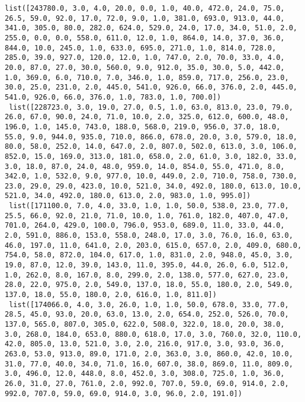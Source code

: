\documentclass[11pt]{article}
\begin{document}
\begin{Verbatim}[commandchars=\\\{\}]
 list([243780.0, 3.0, 4.0, 20.0, 0.0, 1.0, 40.0, 472.0, 24.0, 75.0, 26.5, 59.0, 92.0, 17.0, 72.0, 9.0, 1.0, 381.0, 693.0, 913.0, 44.0, 341.0, 305.0, 80.0, 282.0, 624.0, 529.0, 24.0, 17.0, 34.0, 51.0, 2.0, 255.0, 0.0, 0.0, 558.0, 611.0, 12.0, 1.0, 864.0, 14.0, 37.0, 36.0, 844.0, 10.0, 245.0, 1.0, 633.0, 695.0, 271.0, 1.0, 814.0, 728.0, 285.0, 39.0, 927.0, 120.0, 12.0, 1.0, 747.0, 2.0, 70.0, 33.0, 4.0, 20.0, 87.0, 27.0, 30.0, 560.0, 9.0, 912.0, 35.0, 30.0, 5.0, 442.0, 1.0, 369.0, 6.0, 710.0, 7.0, 346.0, 1.0, 859.0, 717.0, 256.0, 23.0, 30.0, 25.0, 231.0, 2.0, 445.0, 541.0, 926.0, 66.0, 376.0, 2.0, 445.0, 541.0, 926.0, 66.0, 376.0, 1.0, 783.0, 1.0, 700.0])
 list([228723.0, 3.0, 19.0, 27.0, 0.5, 1.0, 63.0, 813.0, 23.0, 79.0, 26.0, 67.0, 90.0, 24.0, 71.0, 10.0, 2.0, 325.0, 612.0, 600.0, 48.0, 196.0, 1.0, 145.0, 743.0, 188.0, 568.0, 219.0, 956.0, 37.0, 18.0, 55.0, 9.0, 944.0, 935.0, 710.0, 866.0, 678.0, 20.0, 3.0, 579.0, 18.0, 80.0, 58.0, 252.0, 14.0, 647.0, 2.0, 807.0, 502.0, 613.0, 3.0, 106.0, 852.0, 15.0, 169.0, 313.0, 181.0, 658.0, 2.0, 61.0, 3.0, 182.0, 33.0, 3.0, 18.0, 87.0, 24.0, 48.0, 959.0, 14.0, 854.0, 55.0, 471.0, 8.0, 342.0, 1.0, 532.0, 9.0, 977.0, 10.0, 449.0, 2.0, 710.0, 758.0, 730.0, 23.0, 29.0, 29.0, 423.0, 10.0, 521.0, 34.0, 492.0, 180.0, 613.0, 10.0, 521.0, 34.0, 492.0, 180.0, 613.0, 2.0, 983.0, 1.0, 995.0])
 list([171100.0, 7.0, 4.0, 33.0, 1.0, 1.0, 50.0, 538.0, 23.0, 77.0, 25.5, 66.0, 92.0, 21.0, 71.0, 10.0, 1.0, 761.0, 182.0, 407.0, 47.0, 701.0, 264.0, 429.0, 100.0, 796.0, 953.0, 689.0, 11.0, 33.0, 44.0, 2.0, 591.0, 886.0, 153.0, 558.0, 248.0, 17.0, 3.0, 76.0, 16.0, 63.0, 46.0, 197.0, 11.0, 641.0, 2.0, 203.0, 615.0, 657.0, 2.0, 409.0, 680.0, 754.0, 58.0, 872.0, 104.0, 617.0, 1.0, 831.0, 2.0, 948.0, 45.0, 3.0, 19.0, 87.0, 12.0, 39.0, 143.0, 11.0, 395.0, 44.0, 26.0, 6.0, 512.0, 1.0, 262.0, 8.0, 167.0, 8.0, 299.0, 2.0, 138.0, 577.0, 627.0, 23.0, 28.0, 22.0, 975.0, 2.0, 549.0, 137.0, 18.0, 55.0, 180.0, 2.0, 549.0, 137.0, 18.0, 55.0, 180.0, 2.0, 616.0, 1.0, 811.0])
 list([174066.0, 4.0, 3.0, 26.0, 1.0, 1.0, 50.0, 678.0, 33.0, 77.0, 28.5, 45.0, 93.0, 20.0, 63.0, 13.0, 2.0, 654.0, 252.0, 526.0, 70.0, 137.0, 565.0, 807.0, 305.0, 622.0, 508.0, 322.0, 18.0, 20.0, 38.0, 3.0, 268.0, 184.0, 653.0, 880.0, 618.0, 17.0, 3.0, 760.0, 32.0, 110.0, 42.0, 805.0, 13.0, 521.0, 3.0, 2.0, 216.0, 917.0, 3.0, 93.0, 36.0, 263.0, 53.0, 913.0, 89.0, 171.0, 2.0, 363.0, 3.0, 860.0, 42.0, 10.0, 31.0, 77.0, 40.0, 34.0, 71.0, 16.0, 607.0, 38.0, 869.0, 11.0, 809.0, 3.0, 496.0, 12.0, 448.0, 8.0, 452.0, 3.0, 308.0, 725.0, 1.0, 36.0, 26.0, 31.0, 27.0, 761.0, 2.0, 992.0, 707.0, 59.0, 69.0, 914.0, 2.0, 992.0, 707.0, 59.0, 69.0, 914.0, 3.0, 96.0, 2.0, 191.0])

\end{Verbatim}
\end{document}
